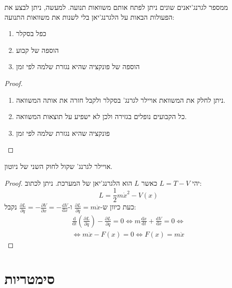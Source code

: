 \documentclass{tstextbook}
\begin{document}
\begin{theorem}
ממספר לגרנג'יאנים שונים ניתן לפתח אותם משוואות תנועה. למעשה, ניתן לבצע את הפעולות הבאות על הלגרנג'יאן בלי לשנות את משוואות התנועה:

  \begin{enumerate}
    \item כפל בסקלר 


    \item הוספה של קבוע 


    \item הוספה של פונקציה שהיא נגזרת שלמה לפי זמן 


  \end{enumerate}
\end{theorem}
\begin{proof}
  \begin{enumerate}
    \item ניתן לחלק את המשוואת אויילר לגרנג' בסקלר ולקבל חזרה את אותה המשוואה. 


    \item כל הקבועים נופלים בגזירה ולכן לא ישפיע על תוצאות המשוואה. 


    \item פונקציה שהיא נגזרת שלמה לפי זמן 


  \end{enumerate}
\end{proof}
\begin{proposition}
אויילר לגרנג' שקול לחוק השני של ניוטון.

\end{proposition}
\begin{proof}
יהי \(L=T-V\) כאשר \(L\) הוא הלגרנג'יאן של המערכת. ניתן לכתוב:
$$L=\frac{1}{2}m\dot{x}^{2}-V(x)$$
כעת כיוון ש-\(\frac{\partial L}{\partial \dot{q}}=m\dot{x}\) ו-\(\frac{\partial L}{\partial q}=-\frac{\partial V}{\partial x}=-\frac{\mathrm{d} V}{\mathrm{d} x}\) נקבל:
\begin{gather*}\frac{\mathrm{d} }{\mathrm{d} t} \left( \frac{\partial L}{\partial \dot{q}}  \right)-\frac{\partial L}{\partial q} =0 \iff m\frac{\mathrm{d} \dot{x}}{\mathrm{d} t} +\frac{\mathrm{d} V}{\mathrm{d} x} =0\iff  \\\iff m\ddot{x}-F(x)=0\iff F(x)=m\ddot{x}
\end{gather*}

\end{proof}
\section{סימטריות}
\end{document}

